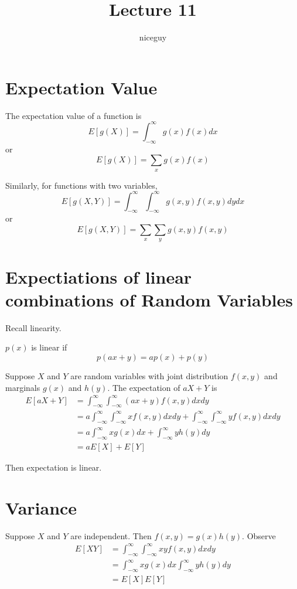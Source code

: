 \documentclass[12pt]{article}
\author{niceguy}
\title{Lecture 11}
\begin{document}
\maketitle

\section{Expectation Value}

\begin{defn}
	The expectation value of a function is
	$$E[g(X)] = \int_{-\infty}^\infty g(x)f(x)dx$$
	or
	$$E[g(X)] = \sum_x g(x)f(x)$$
\end{defn}

\begin{defn}
	Similarly, for functions with two variables,
	$$E[g(X,Y)] = \int_{-\infty}^\infty \int_{-\infty}^\infty g(x,y)f(x,y)dydx$$
	or
	$$E[g(X,Y)] = \sum_x \sum_y g(x,y)f(x,y)$$
\end{defn}

\section{Expectiations of linear combinations of Random Variables}

Recall linearity.

\begin{defn}
	$p(x)$ is linear if
	$$p(ax+y) = ap(x) + p(y)$$
\end{defn}

Suppose $X$ and $Y$ are random variables with joint distribution $f(x,y)$ and marginals $g(x)$ and $h(y)$. The expectation of $aX+Y$ is
\begin{align*}
	E[aX+Y] &= \int_{-\infty}^\infty \int_{-\infty}^\infty (ax+y)f(x,y)dxdy \\
		&= a\int_{-\infty}^\infty \int_{-\infty}^\infty xf(x,y)dxdy + \int_{-\infty}^\infty \int_{-\infty}^\infty yf(x,y)dxdy \\
		&= a\int_{-\infty}^\infty xg(x)dx + \int_{-\infty}^\infty yh(y)dy \\
		&= aE[X] + E[Y]
\end{align*}

Then expectation is linear.

\section{Variance}

Suppose $X$ and $Y$ are independent. Then $f(x,y)=g(x)h(y)$. Observe
\begin{align*}
	E[XY] &= \int_{-\infty}^\infty \int_{-\infty}^\infty xyf(x,y)dxdy \\
	      &= \int_{-\infty}^\infty xg(x)dx\int_{-\infty}^\infty yh(y)dy \\
	      &= E[X]E[Y]
\end{align*}
\end{document}

